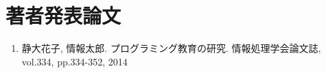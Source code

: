 \chapter*{著者発表論文}
\begin{enumerate}
\renewcommand{\labelenumi}{[\arabic{enumi}]}

\item 静大花子, 情報太郎. 
プログラミング教育の研究.  
情報処理学会論文誌, vol.334, pp.334-352, 2014


\end{enumerate}